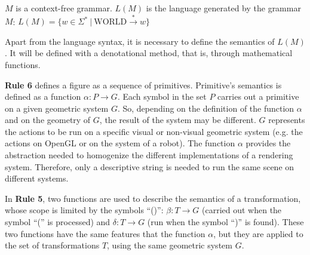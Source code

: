 \documentclass{svmult}
\begin{document}
$M$ is a context-free grammar. $L(M)$ is the language generated by the grammar $M$:
$L(M) = \lbrace w \in \Sigma^* \ | \ \text{WORLD} \stackrel{*}{\rightarrow} w \rbrace$



Apart from the language syntax, it is necessary to define the semantics of $L(M)$. It will be defined with a denotational method, that is, through mathematical functions. 


\textbf{Rule 6} defines a figure as a sequence of primitives. Primitive's semantics is defined as a function $\alpha: P \rightarrow G$. Each symbol in the set $P$ carries out a primitive on a given geometric
system $G$. So, depending on the definition of the function $\alpha$ and on the geometry of $G$, the result of
the system may be different. $G$ represents the actions to be run on a specific visual or
non-visual geometric system (e.g. the actions on OpenGL or on the system of a robot).
The function $\alpha$ provides the abstraction needed to homogenize the
different implementations of a rendering system. Therefore, only a descriptive string is needed to
run the same scene on different systems.



In \textbf{Rule 5}, two functions are used to describe the semantics of a transformation, whose scope is limited by the symbols ``()'': $\beta: T \rightarrow G$ (carried out when the symbol ``('' is processed) and $\delta: T \rightarrow G$ (run when the symbol ``)'' is found). These two functions have the same features that the function $\alpha$, but they are applied to the set of transformations $T$, using the same geometric system
$G$.
\end{document}
